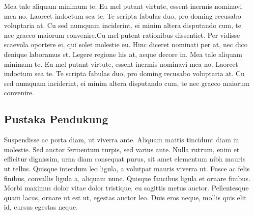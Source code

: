 Mea tale aliquam minimum te. Eu mel putant virtute, essent inermis nominavi mea no. Laoreet indoctum sea te. Te scripta fabulas duo, pro doming recusabo voluptaria at. Cu sed numquam inciderint, ei minim altera disputando cum, te nec graeco maiorum convenire.Cu mel putent rationibus dissentiet. Per vidisse scaevola oportere ei, qui solet molestie eu. Hinc diceret nominati per at, nec dico denique laboramus et. Legere regione his at, aeque decore in. Mea tale aliquam minimum te. Eu mel putant virtute, essent inermis nominavi mea no. Laoreet indoctum sea te. Te scripta fabulas duo, pro doming recusabo voluptaria at. Cu sed numquam inciderint, ei minim altera disputando cum, te nec graeco maiorum convenire.\\

\subsection{Pustaka Pendukung}
Suspendisse ac porta diam, ut viverra ante. Aliquam mattis tincidunt diam in molestie. Sed auctor fermentum turpis, sed varius ante. Nulla rutrum, enim et efficitur dignissim, urna diam consequat purus, sit amet elementum nibh mauris ut tellus. Quisque interdum leo ligula, a volutpat mauris viverra ut. Fusce ac felis finibus, convallis ligula a, aliquam nunc. Quisque faucibus ligula et ornare finibus. Morbi maximus dolor vitae dolor tristique, eu sagittis metus auctor. Pellentesque quam lacus, ornare ut est ut, egestas auctor leo. Duis eros neque, mollis quis elit id, cursus egestas neque.\\
